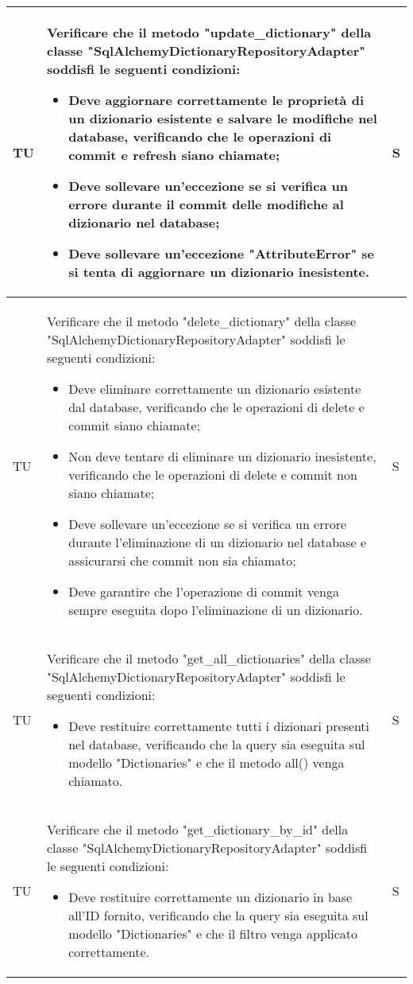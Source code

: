 \begin{adjustwidth}{-0.5cm}{-0.5cm}
\begin{longtable}{|P{1.5cm}|>{\raggedright}P{9.5cm}|>{\arraybackslash}P{1.5cm}|}
	\hline TU & Verificare che il metodo "update\_dictionary" della classe "SqlAlchemyDictionaryRepositoryAdapter" soddisfi le seguenti condizioni:
	\begin{itemize}
		\item Deve aggiornare correttamente le proprietà di un dizionario esistente e salvare le modifiche nel database, verificando che le operazioni di commit e refresh siano chiamate;
		\item Deve sollevare un'eccezione se si verifica un errore durante il commit delle modifiche al dizionario nel database;
		\item Deve sollevare un'eccezione "AttributeError" se si tenta di aggiornare un dizionario inesistente.
	\end{itemize} & S \\

	\hline TU & Verificare che il metodo "delete\_dictionary" della classe "SqlAlchemyDictionaryRepositoryAdapter" soddisfi le seguenti condizioni:
	\begin{itemize}
		\item Deve eliminare correttamente un dizionario esistente dal database, verificando che le operazioni di delete e commit siano chiamate;
		\item Non deve tentare di eliminare un dizionario inesistente, verificando che le operazioni di delete e commit non siano chiamate;
		\item Deve sollevare un'eccezione se si verifica un errore durante l'eliminazione di un dizionario nel database e assicurarsi che commit non sia chiamato;
		\item Deve garantire che l'operazione di commit venga sempre eseguita dopo l'eliminazione di un dizionario.
	\end{itemize} & S \\

	\hline TU & Verificare che il metodo "get\_all\_dictionaries" della classe "SqlAlchemyDictionaryRepositoryAdapter" soddisfi le seguenti condizioni:
	\begin{itemize}
		\item Deve restituire correttamente tutti i dizionari presenti nel database, verificando che la query sia eseguita sul modello "Dictionaries" e che il metodo all() venga chiamato.
	\end{itemize} & S \\

	\hline TU & Verificare che il metodo "get\_dictionary\_by\_id" della classe "SqlAlchemyDictionaryRepositoryAdapter" soddisfi le seguenti condizioni:
	\begin{itemize}
		\item Deve restituire correttamente un dizionario in base all'ID fornito, verificando che la query sia eseguita sul modello "Dictionaries" e che il filtro venga applicato correttamente.
	\end{itemize} & S \\


\end{longtable}
\end{adjustwidth}
